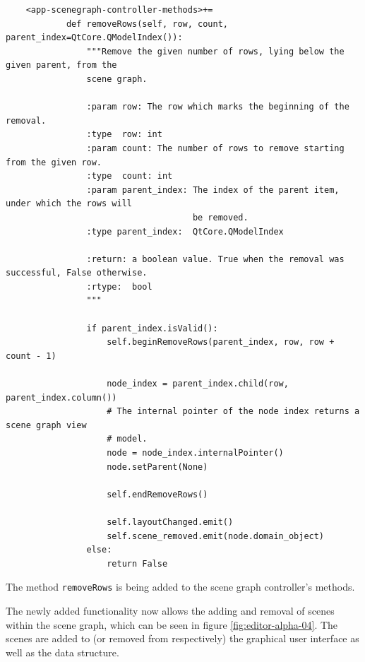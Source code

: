\documentclass[10pt, openright, notitlepage]{scrreprt}
\begin{document}
\begin{listing}[H]
\begin{verbatim}
    <app-scenegraph-controller-methods>+=
            def removeRows(self, row, count, parent_index=QtCore.QModelIndex()):
                """Remove the given number of rows, lying below the given parent, from the
                scene graph.
            
                :param row: The row which marks the beginning of the removal.
                :type  row: int
                :param count: The number of rows to remove starting from the given row.
                :type  count: int
                :param parent_index: The index of the parent item, under which the rows will
                                     be removed.
                :type parent_index:  QtCore.QModelIndex
            
                :return: a boolean value. True when the removal was successful, False otherwise.
                :rtype:  bool
                """
            
                if parent_index.isValid():
                    self.beginRemoveRows(parent_index, row, row + count - 1)
            
                    node_index = parent_index.child(row, parent_index.column())
                    # The internal pointer of the node index returns a scene graph view
                    # model.
                    node = node_index.internalPointer()
                    node.setParent(None)
            
                    self.endRemoveRows()
            
                    self.layoutChanged.emit()
                    self.scene_removed.emit(node.domain_object)
                else:
                    return False
\end{verbatim}
\caption{\label{lst:app-scenegraph-controller-methods-remove-rows}
The method \texttt{removeRows} is being added to the scene graph controller's methods.}
\end{listing}

The newly added functionality now allows the adding and removal of scenes within
the scene graph, which can be seen in figure \ref{fig:editor-alpha-04}. The scenes are
added to (or removed from respectively) the graphical user interface as well as
the data structure.
\end{document}
